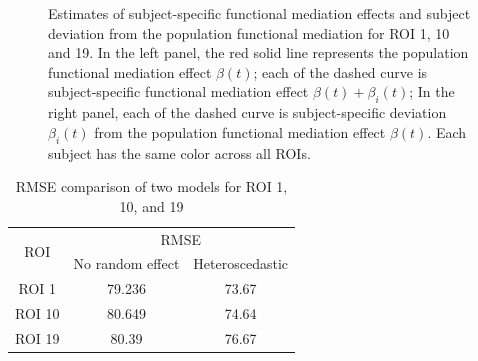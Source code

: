 \begin{figure}[h!]
\centering
\caption{Estimates of subject-specific functional mediation effects and subject deviation from the population functional mediation for ROI 1, 10 and 19. In the left panel, the red solid line represents the population functional mediation effect  $\beta(t)$; each of the dashed curve is subject-specific functional mediation effect $ \beta(t) + \beta_i(t)$; In the right panel, each of  the dashed curve is subject-specific deviation $\beta_i(t)$ from the population functional mediation effect $ \beta(t)$. Each subject has the same color across all ROIs.}
\label{betat}
\end{figure}



\begin{table}[!h]
 \caption{RMSE comparison of two models for ROI 1, 10, and 19}   
 \centering
\begin{tabular}{ c | c   c  }\hline\hline
 \multirow{2}{*}{ROI}
  & \multicolumn{2}{c}{RMSE}  \\ \cline{2-3}
  & No random effect  & Heteroscedastic \\
  \cline{1-3}
ROI 1 &  79.236  & 73.67 \\ \cline{1-3}
ROI 10 & 80.649 & 74.64 \\ \cline{1-3}
ROI 19 & 80.39 & 76.67\\
\hline
\hline
 \end{tabular}  
\end{table}
  
  
